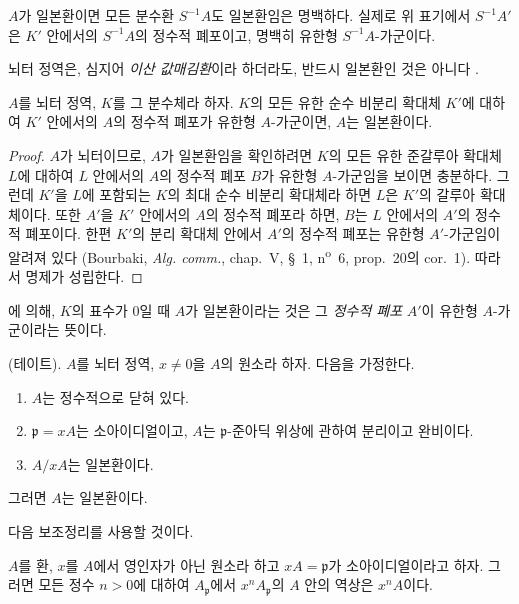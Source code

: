 $A$가 일본환이면 모든 분수환 $S^{-1}A$도 일본환임은 명백하다.
실제로 위 표기에서 $S^{-1}A'$은 $K'$ 안에서의 $S^{-1}A$의 정수적
폐포이고, 명백히 유한형 $S^{-1}A$-가군이다.

뇌터 정역은, 심지어 \emph{이산 값매김환}이라 하더라도, 반드시
일본환인 것은 아니다 \cite{IV-30}.

\begin{proposition}[23.1.2]
\label{0.23.1.2-ko}
$A$를 뇌터 정역, $K$를 그 분수체라 하자. $K$의 모든 유한 순수
비분리 확대체 $K'$에 대하여 $K'$ 안에서의 $A$의 정수적 폐포가
유한형 $A$-가군이면, $A$는 일본환이다.
\end{proposition}

\begin{proof}
$A$가 뇌터이므로, $A$가 일본환임을 확인하려면 $K$의 모든 유한
준갈루아 확대체 $L$에 대하여 $L$ 안에서의 $A$의 정수적 폐포 $B$가
유한형 $A$-가군임을 보이면 충분하다. 그런데 $K'$을 $L$에 포함되는
$K$의 최대 순수 비분리 확대체라 하면 $L$은 $K'$의 갈루아
확대체이다. 또한 $A'$을 $K'$ 안에서의 $A$의 정수적 폐포라 하면,
$B$는 $L$ 안에서의 $A'$의 정수적 폐포이다. 한편 $K'$의 분리 확대체
안에서 $A'$의 정수적 폐포는 유한형 $A'$-가군임이 알려져 있다
(Bourbaki, \emph{Alg. comm.}, chap.~V, §~1,
n\textsuperscript{o}~6, prop.~20의 cor.~1). 따라서 명제가 성립한다.
\end{proof}

에 의해, $K$의 표수가 $0$일 때 $A$가 일본환이라는
것은 그 \emph{정수적 폐포} $A'$이 유한형 $A$-가군이라는 뜻이다.

\begin{theorem}[23.1.3]
\label{0.23.1.3-ko}
\textnormal{(테이트).} $A$를 뇌터 정역, $x\neq0$을 $A$의 원소라 하자.
다음을 가정한다.
\begin{enumerate}
  \item[(i)] $A$는 정수적으로 닫혀 있다.
  \item[(ii)] $\mathfrak p=xA$는 소아이디얼이고, $A$는
  $\mathfrak p$-준아딕 위상에 관하여 분리이고 완비이다.
  \item[(iii)] $A/xA$는 일본환이다.
\end{enumerate}
그러면 $A$는 일본환이다.
\end{theorem}

다음 보조정리를 사용할 것이다.

\begin{lemma}[23.1.3.1]
\label{0.23.1.3.1-ko}
$A$를 환, $x$를 $A$에서 영인자가 아닌 원소라 하고
$xA=\mathfrak p$가 소아이디얼이라고 하자. 그러면 모든 정수 $n>0$에
대하여 $A_{\mathfrak p}$에서 $x^nA_{\mathfrak p}$의 $A$ 안의
역상은 $x^nA$이다.
\end{lemma}


